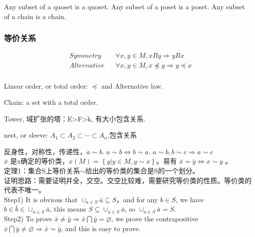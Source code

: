 \documentclass[UTF8]{../09-Mathematics}
\begin{document}
\begin{proposition}
  Any subset of a quoset is a quoset.
  Any subset of a poset is a poset.
  Any subset of a chain is a chain. 
\end{proposition}


\subsubsection{等价关系}

\begin{equation}
  \begin{aligned}
  &Symmetry & & \forall x,y \in M, x R y \Rightarrow  y R x\\
  &Alternative & & \forall x,y \in M, x \npreceq  y \Rightarrow  y \preceq x\\
  \end{aligned}
\end{equation}


\begin{proposition}
  Linear order, or total order: $\preceq$ and Alternative law.

  Chain: a set with a total order.

  Tower, 域扩张的塔：E>F>k, 有大小包含关系.

  nest, or sleeve: $A_1 \subset A_2 \subset \cdots  \subset A_n$,包含关系
\end{proposition}

反身性，对称性，传递性，$a \sim b$. $a \sim b \Leftrightarrow b \sim a$. $a \sim b , b \sim c \Rightarrow a \sim c$\\
$\bar x$ 是x确定的等价类，$x(M) = \left\{ y | y \in M, y \sim x \right\}$。易有
$\bar x = \bar y \Leftrightarrow x \sim y$ 。\\


定理1：集合S上等价关系$\sim$给出的等价类的集合是S的一个划分。\\
证明思路：需要证明并全，交空。交空比较难，需要研究等价类的性质。等价类的代表不唯一。\\
Step1)  It is obvious that $\cup _{a \in S} {\bar a} \subseteq S$，and for any $b \in S$, we have $b \in \bar b \in \cup _{a \in S} {\bar a}$, this means $S \subseteq \cup _{a \in S} {\bar a}  $, so $ \cup _{a \in S} {\bar a} =S $.\\
Step2) To prove $\bar x \neq \bar y \Rightarrow \bar x \bigcap \bar y = \varnothing  $, we prove the contrapositive $ \bar x \bigcap \bar y \neq \varnothing \Rightarrow  \bar x = \bar y$, and this is easy to prove.\\
\end{document}
